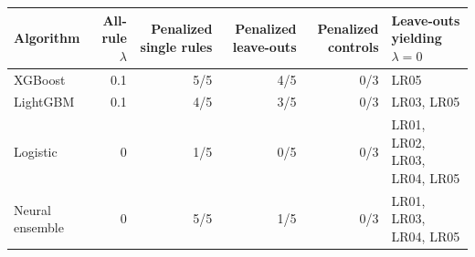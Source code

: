 \begin{tabular}{lrrrrp{3.2cm}}
\toprule
Algorithm & All-rule $\lambda$ & Penalized single rules & Penalized leave-outs & Penalized controls & Leave-outs yielding $\lambda=0$ \\
\midrule
XGBoost & 0.1 & 5/5 & 4/5 & 0/3 & LR05 \\
LightGBM & 0.1 & 4/5 & 3/5 & 0/3 & LR03, LR05 \\
Logistic & 0 & 1/5 & 0/5 & 0/3 & LR01, LR02, LR03, LR04, LR05 \\
Neural ensemble & 0 & 5/5 & 1/5 & 0/3 & LR01, LR03, LR04, LR05 \\
\bottomrule
\end{tabular}
